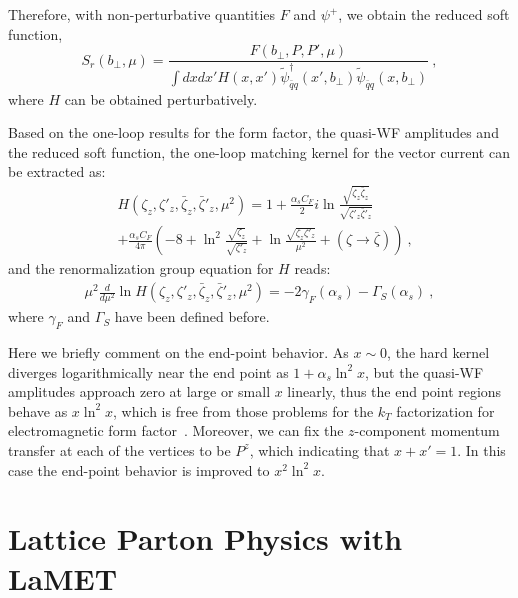 \documentclass[aps,rmp,reprint,amsmath,amssymb,graphicx,longbibliography]{revtex4-1} %
\begin{document}
Therefore, with non-perturbative quantities $F$ and $\psi^+$, we obtain the reduced soft function,
\begin{equation}
	S_{r}(b_\perp,\mu)=\frac{F(b_\perp,P,P',\mu)}{\int dx dx' H(x,x')\tilde \psi_{\bar q q}^{\dagger}(x',b_\perp)\tilde \psi_{\bar q q}(x,b_\perp)} \ ,
	\label{eq:form_qfac}
\end{equation}
where $H$ can be obtained perturbatively.

Based on the one-loop results for the form factor, the quasi-WF amplitudes and the reduced soft function, the one-loop matching kernel for the vector current can be extracted as:
\begin{align}
	&H(\zeta_z,\zeta'_z,\bar \zeta_z,\bar \zeta'_z,\mu^2)=1+ \frac{\alpha_sC_F}{2}i\ln \frac{\sqrt{\zeta_z\bar\zeta_z}}{\sqrt{\zeta'_z\bar\zeta'_z}}  \\
	&+\frac{\alpha_sC_F}{4\pi}\left(-8+\ln^2\frac{\sqrt{\zeta_z}}{\sqrt{\zeta'_z}}+\ln \frac{\sqrt{\zeta_z\zeta'_z}}{\mu^2}+(\zeta \rightarrow \bar \zeta)\right)\nonumber \ ,
\end{align}
and the renormalization group equation for $H$ reads:
\begin{align}
	\mu^2\frac{d}{d\mu^2}\ln H(\zeta_z,\zeta'_z,\bar \zeta_z,\bar \zeta'_z,\mu^2)=-2\gamma_F(\alpha_s)-\Gamma_{S}(\alpha_s) \ ,
\end{align}
where $\gamma_F$ and $\Gamma_S$ have been defined before.

Here we briefly comment on the end-point behavior. As $x\sim 0$, the hard kernel diverges logarithmically near the end point as $ 1+\alpha_s \ln^2 x$, but the quasi-WF amplitudes approach zero at large or small $x$ linearly, thus the end point regions behave as $x\ln^2 x$, which is free from those problems for the $k_T$ factorization for electromagnetic form factor~\cite{Li:1992nu}. Moreover, we can fix the $z$-component momentum transfer at each of the vertices to be $P^z$, which indicating that $x+x'=1$. In this case the end-point behavior is improved to $x^2\ln^2 x$.

\section{Lattice Parton Physics with LaMET}
\label{sec:lattice}
\end{document}
